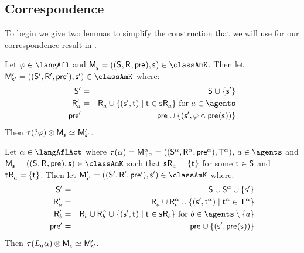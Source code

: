\subsection{Correspondence}

To begin we give two lemmas to simplify the construction that we will use for our correspondence result in \classK{}.

\begin{lemma}\label{afl-k-construction-test}
Let $\phi \in \langAfl$ and $\aPModel{\aStateS} = \aPModelTuple{\aStateS} \in \classAmK$.
Then let $\aPModelP{\aStateSP} = \aPModelTupleP{\aStateSP} \in \classAmK$ where:
\begin{eqnarray*}
    \aStatesP &=& \aStates \cup \{\aStateSP\}\\
    \aAccessibilityP{\agentA} &=& \aAccessibility{\agentA} \cup \{(\aStateSP, \aStateT) \mid \aStateT \in \aStateS \aAccessibility{\agentA}\} \text{ for } \agentA \in \agents\\
    \aPreconditionP &=& \aPrecondition \cup \{(\aStateSP, \phi \land \aPrecondition(\aStateS))\}
\end{eqnarray*}
Then $\tau(\test{\phi}) \exec \aPModel{\aStateS}  \bisimilar \aPModelP{\aStateSP}$.
\end{lemma}

\begin{lemma}\label{afl-k-construction-learning}
Let $\alpha \in \langAflAct$ where $\tau(\alpha) = \aPModel[\alpha]{\aStatesT[\alpha]} = \aPModelTuple[\alpha]{\aStatesT[\alpha]}$, $\agentA \in \agents$ and $\aPModel{\aStateS} = \aPModelTuple{\aStateS} \in \classAmK$ such that $\aStateS \aAccessibility{\agentA} = \{\aStateT\}$ for some $\aStateT \in \aStates$ and $\aStateT \aAccessibility{\agentA} = \{\aStateT\}$.
Then let $\aPModelP{\aStateSP} = \aPModelTupleP{\aStateSP} \in \classAmK$ where:
\begin{eqnarray*}
    \aStatesP &=& \aStates \cup \aStates[\alpha] \cup \{\aStateSP\}\\
    \aAccessibilityP{\agentA} &=& \aAccessibility{\agentA} \cup \aAccessibility[\alpha]{\agentA} \cup \{(\aStateSP, \aStateT[\alpha]) \mid \aStateT[\alpha] \in \aStatesT[\alpha]\}\\
    \aAccessibilityP{\agentB} &=& \aAccessibility{\agentB} \cup \aAccessibility[\alpha]{\agentB} \cup \{(\aStateSP, \aStateT) \mid \aStateT \in \aStateS \aAccessibility{\agentB}\} \text{ for } \agentB \in \agents \setminus \{\agentA\}\\
    \aPreconditionP &=& \aPrecondition \cup \{(\aStateSP, \aPrecondition(\aStateS))\}
\end{eqnarray*}
Then $\tau(\learnsA \alpha) \exec \aPModel{\aStateS} \bisimilar \aPModelP{\aStateSP}$.
\end{lemma}

